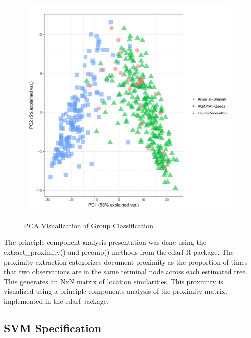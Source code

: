 \begin{figure}
\begin{center}
\begin{tabular}{c}
 \includegraphics[width=5.00in]{./Pictures/pca_proximityRF.pdf}
\end{tabular}
\caption{PCA Visualization of Group Classification}
\label{fig:rf-pca1}
\end{center}
 \end{figure}

The principle component analysis presentation was done using the
extract\_proximity() and prcomp() methods from the edarf R
package. The proximity extraction categorizes document proximity as
the proportion of times that two observations are in the same terminal
node across each estimated tree. This generates an NxN matrix of
location similarities.  This proximity is visualized using a principle
components analysis of the proximity matrix, implemented in the edarf package.

\subsection{SVM Specification}

